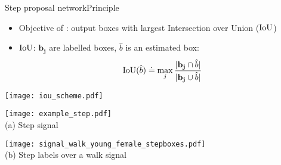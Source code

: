 \begin{frame}{Step proposal network}{Principle}

\begin{minipage}{0.7\linewidth}
    \begin{itemize}
        \item Objective of \subalgo: output boxes with largest Intersection over Union ($\mathrm{IoU}$)
        \item $\mathrm{IoU}$: $\mathbf{b_j}$ are labelled boxes, $\hat{b}$ is an estimated box:
    \begin{equation*}\label{eq: def IOU}
    \mathrm{IoU}(\hat{b}) \doteq \max_{j} \frac{ \vert \mathbf{b_j} \cap \hat{b}\vert}{\vert \mathbf{b_j} \cup \hat{b}\vert}
    \end{equation*}
    \end{itemize}
\end{minipage}\hfill
\begin{minipage}{0.3\linewidth}
    \centering
    \texttt{[image: iou\_scheme.pdf]}
\end{minipage}

\pause

    \centering
    \begin{minipage}[t]{0.4\linewidth}
        \centering
        \texttt{[image: example\_step.pdf]}\\
        {\small (a)\; Step signal}
    \end{minipage}\hfill
    \begin{minipage}[t]{0.5\linewidth}
        \centering
        \texttt{[image: signal\_walk\_young\_female\_stepboxes.pdf]}\\
        {\small (b)\; Step labels over a walk signal}
    \end{minipage}
\end{frame}

